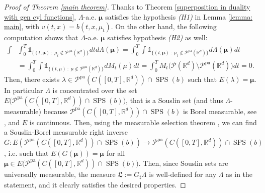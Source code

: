 \documentclass[10pt,leqno]{amsart}
\numberwithin{equation}{section}
\newcommand{\R}{\mathbb{R}}
\newcommand{\PP}{\mathcal{P}}
\newcommand{\PPpa}{\PP^{\operatorname{pa}}}
\begin{document}
\begin{proof}[Proof of Theorem \ref{main theorem}]
    Thanks to Theorem \ref{superposition in duality with gen cyl functions}, $\Lambda$-a.e. $\boldsymbol{\mu}$ satisfies the hypothesis \textit{(H1)} in Lemma \ref{lemma: main}, with $v(t,x) = b(t,x,\mu_t)$. On the other hand, the following computation shows that $\Lambda$-a.e. $\boldsymbol{\mu}$ satisfies hypothesis \textit{(H2)} as well:
    \[
    \begin{aligned}
    \int &  \int_0^T \mathds{1}_{\{(t,\boldsymbol{\mu}) \ : \ \mu_t \notin \PPpa(\R^d)\}} dt d\Lambda(\boldsymbol{\mu}) = \int_0^T \int \mathds{1}_{\{(t,\boldsymbol{\mu}) \ : \ \mu_t \notin \PPpa(\R^d)\}} d\Lambda(\boldsymbol{\mu}) dt
    \\
    & = \int_0^T \int \mathds{1}_{\{(t,\mu) \ : \ \mu \notin \PPpa(\R^d)\}} dM_t(\mu) dt = \int_0^T M_t\big( \PP(\R^d) \setminus \PPpa(\R^d) \big) dt = 0.
    \end{aligned}
    \]
    Then, there exists $\lambda \in \PPpa(C([0,T],\R^d)) \cap \operatorname{SPS}(b)$ such that $E(\lambda) = \boldsymbol{\mu}$. In particular $\Lambda$ is concentrated over the set $E\big(\PPpa(C([0,T],\R^d)) \cap \operatorname{SPS}(b)\big)$, that is a Souslin set (and thus $\Lambda$-measurable) because $\PPpa(C([0,T],\R^d)) \cap \operatorname{SPS}(b)$ is Borel measurable, see \cite[Proposition 5.8]{pinzisavare2025}, and $E$ is continuous. Then, using the measurable selection theorem \cite[Theorem 6.9.1]{bogachev2007measure}, we can find a Souslin-Borel measurable right inverse $G: E(\PPpa(C([0,T],\R^d)) \cap \operatorname{SPS}(b)) \to \PPpa(C([0,T],\R^d)) \cap \operatorname{SPS}(b)$, i.e. such that $E(G(\boldsymbol{\mu})) = \boldsymbol{\mu}$ for all $\boldsymbol{\mu}\in E\big(\PPpa(C([0,T],\R^d)) \cap \operatorname{SPS}(b)\big)$. Then, since Souslin sets are universally measurable, the measure $\mathfrak{L}:= G_\sharp \Lambda$ is well-defined for any $\Lambda$ as in the statement, and it clearly satisfies the desired properties.
\end{proof}
\end{document}
